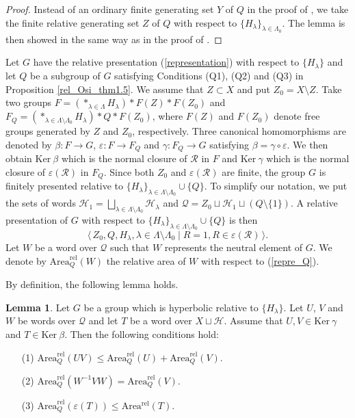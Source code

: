 \documentclass{amsart}
\theoremstyle{definition}
\newtheorem{Lem}[Thm]{Lemma}
\begin{document}
\begin{proof}
Instead of an ordinary finite generating set $Y$ of $Q$ in the proof of \cite[Lemma 3.2]{Osi06a}, we take the finite relative generating set $Z$ of $Q$ with respect to $\{H_\lambda\}_{\lambda\in \Lambda_0}$. 
The lemma is then showed in the same way as in the proof of \cite[Lemma 3.2]{Osi06a}. 
\end{proof}

Let $G$ have the relative presentation (\ref{representation}) with respect to $\{H_\lambda\}$ and let $Q$ be a subgroup of $G$ satisfying Conditions (Q1), (Q2) and (Q3) in Proposition \ref{rel_Osi_thm1.5}. 
We assume that $Z\subset X$ and put $Z_0=X\setminus Z$. 
Take two groups
$F=(*_{\lambda \in \Lambda}H_\lambda)* F(Z)* F(Z_0)$ and $F_Q=(*_{\lambda \in \Lambda \setminus \Lambda_0}H_\lambda)* Q * F(Z_0)$, where $F(Z)$ and $F(Z_0)$ denote free groups generated by $Z$ and $Z_0$, respectively. 
Three canonical homomorphisms are denoted by $\beta \colon F \rightarrow G$, $\varepsilon \colon F \rightarrow F_Q$ and $\gamma \colon F_Q \rightarrow G$ satisfying $\beta=\gamma \circ \varepsilon$. 
We then obtain $\text{Ker}\ \beta$ which is the normal closure of ${\mathcal R}$ in $F$ and $\text{Ker}\ \gamma$ which is the normal closure of $\varepsilon(\mathcal R)$ in $F_Q$. 
Since both $Z_0$ and $\varepsilon(\mathcal R)$ are finite, the group $G$ is finitely presented relative to $\{H_\lambda\}_{\lambda \in \Lambda \setminus \Lambda_0}\cup \{Q\}$.
To simplify our notation, we put the sets of words ${\mathcal H}_1=\bigsqcup_{\lambda\in\Lambda\setminus\Lambda_0}{\mathcal H}_\lambda$ and $\mathcal Q=Z_0\sqcup\mathcal H_1 \sqcup(Q\setminus \{1\})$. 
A relative presentation of $G$ with respect to $\{H_\lambda\}_{\lambda\in \Lambda\setminus \Lambda_0}\cup \{Q\}$ is then 
\begin{equation}\label{repre_Q}
\langle \, Z_0, Q, H_{\lambda}, \lambda \in \Lambda \setminus \Lambda_{0} \mid R=1, R\in \varepsilon({\mathcal R}) \,\rangle.\end{equation}
Let $W$ be a word over ${\mathcal Q}$ such that $W$ represents the neutral element of $G$. 
We denote by ${\mathrm{Area}_Q^{\mathrm{rel}}}(W)$ the relative area of $W$ with respect to (\ref{repre_Q}). 

By definition, the following lemma holds. 

\begin{Lem}\label{Osi_lem3.3}
Let $G$ be a group which is hyperbolic relative to $\{H_\lambda\}$. 
Let $U$, $V$ and $W$ be words over $\mathcal Q$ and let $T$ be a word over $X\sqcup \mathcal{H}$. 
Assume that $U,V \in \text{Ker}\ \gamma$ and $T \in \text{Ker}\ \beta$. 
Then the following conditions hold: 
\begin{enumerate}
\item[(1)] ${\mathrm{Area}_Q^{\mathrm{rel}}}(UV)\leq {\mathrm{Area}_Q^{\mathrm{rel}}}(U)+{\mathrm{Area}_Q^{\mathrm{rel}}}(V)$.
\item[(2)] ${\mathrm{Area}_Q^{\mathrm{rel}}}(W^{-1}VW)={\mathrm{Area}_Q^{\mathrm{rel}}}(V)$.
\item[(3)] ${\mathrm{Area}_Q^{\mathrm{rel}}}(\varepsilon(T))\leq {\mathrm{Area^{rel}}}(T)$.
\end{enumerate}
\end{Lem}
\end{document}
